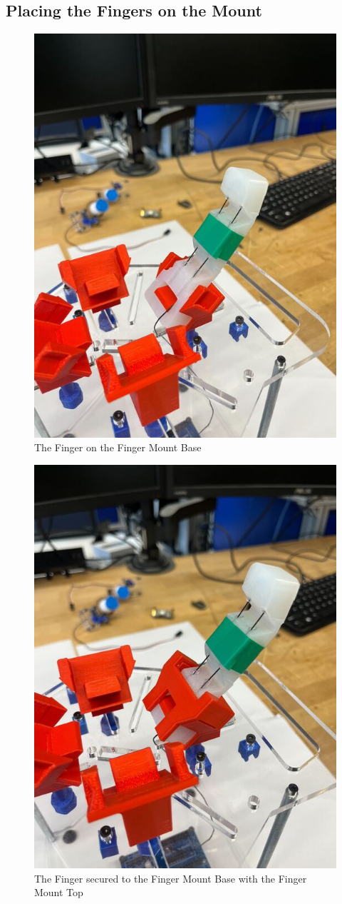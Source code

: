 \documentclass{article}
\begin{document}
\subsection{Placing the Fingers on the Mount}
\begin{figure}[H]
    \centering
    \includegraphics[width=0.5\linewidth]{PCBImages/AttachingFingers/attaching_fingers_3.jpg}
    \caption{The Finger on the Finger Mount Base}
    \label{fig:finger_on_mount_base}
\end{figure}
\begin{figure}[H]
    \centering
    \includegraphics[width=0.5\linewidth]{PCBImages/AttachingFingers/attaching_fingers_4.jpg}
    \caption{The Finger secured to the Finger Mount Base with the Finger Mount Top}
    \label{fig:finger_on_mount_top}
\end{figure}
\end{document}
